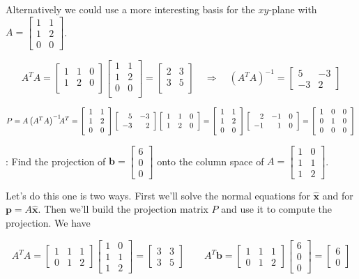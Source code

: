 \documentclass[12pt]{article}
\newcommand{\bs}{\hspace{-.75mm}}
\newcommand{\nin}{\noindent}
\newcommand{\vthree}{\vspace{3mm}}
\newcommand{\myp}[1]{\left( #1 \right)}
\newcommand{\mymat}[1]{
\left[
\begin{array}{rrrrrrrrrrrrrrrrrrrrrrrrrrrrrrrrrrrrrrr}
#1
\end{array}
\right]
}
\newcommand{\bx}{\mathbf{x}}
\newcommand{\bp}{\mathbf{p}}
\newcommand{\bb}{\mathbf{b}}
\begin{document}
\nin Alternatively we could use a more interesting basis for the $xy$-plane with $A = \mymat{1 & 1 \\ 1 & 2 \\ 0 & 0}$.

\[
A^TA = \mymat{
1 & 1 & 0  \\
1 & 2 & 0 \\
}
\mymat{
1 & 1 \\
1 & 2 \\
0 & 0 \\
}
=
\mymat{
2 & 3   \\
3 & 5   \\
}
\quad \Rightarrow \quad
\myp{A^TA}^{-1} =
\mymat{
5 & -3 \\
-3 & 2
}
\]

\vthree

\[
P = A\myp{A^TA}^{-1}\bs\bs A^T =
\mymat{
1 & 1 \\
1 & 2 \\
0 & 0 \\
}
\mymat{
5 & -3 \\
-3 & 2
}
\mymat{
1 & 1 & 0  \\
1 & 2 & 0 \\
}
=
\mymat{
1 & 1 \\
1 & 2 \\
0 & 0 \\
}
\mymat{
2 &-1 & 0  \\
-1 & 1 & 0 \\
}
=
\mymat{
1 & 0 & 0  \\
0 & 1 & 0 \\
0 & 0 & 0 \\
}
\]

\vthree

\nin {\bf Example 2}: Find the projection of $\bb = \mymat{6 \\ 0 \\ 0}$ onto the column space of $A = \mymat{1 & 0 \\ 1 & 1 \\ 1 & 2}$.

\vthree

\nin Let's do this one is two ways.  First we'll solve the normal equations for $\hat{\bx}$ and for $\bp = A\hat{\bx}$.  Then we'll build the projection matrix $P$ and use it to compute the projection.  We have

\[
A^TA =
\mymat{
1 & 1 & 1 \\
0 & 1 & 2
}
\mymat{
1 & 0 \\
1 & 1 \\
1 & 2
} =
\mymat{
3 & 3 \\
3 & 5
}
\quad \quad
A^T\bb =
\mymat{
1 & 1 & 1 \\
0 & 1 & 2
}
\mymat{6 \\ 0 \\ 0}
= \mymat{6 \\ 0}
\]
\end{document}
